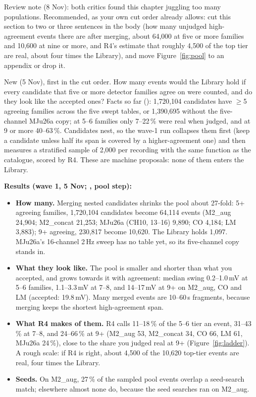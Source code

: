 \begin{instructions}
Review note (8 Nov): both critics found this chapter juggling too many populations. Recommended, as your own cut order
already allows: cut this section to two or three sentences in the body (how many unjudged high-agreement events there
are after merging, about 64,000 at five or more families and 10,600 at nine or more, and R4's estimate that roughly
4,500 of the top tier are real, about four times the Library), and move Figure~\ref{fig:pool} to an appendix or drop
it.

New (5 Nov), first in the cut order. How many events would the Library hold if every candidate that five or more
detector families agree on were counted, and do they look like the accepted ones? Facts so far
(): 1,720,104 candidates have $\ge$5 agreeing families across the five swept
tables, or 1,390,695 without the five-channel MJu26a copy; at 5--6 families only 7--22\,\% were real when judged, and
at 9 or more 40--63\,\%. Candidates nest, so the wave-1 run collapses them first (keep a candidate unless half its span
is covered by a higher-agreement one) and then measures a stratified sample of 2,000 per recording with the same
function as the catalogue, scored by R4. These are machine proposals: none of them enters the Library.

\textbf{Results (wave 1, 5 Nov; , pool step):}
\begin{itemize}
  \item \textbf{How many.} Merging nested candidates shrinks the pool about 27-fold: 5+ agreeing families, 1,720,104
        candidates become 64,114 events (M2\_aug 24,904; M2\_concat 21,253; MJu26a (CH10, 13--16) 9,890; CO 4,184;
        LM 3,883); 9+ agreeing, 230,817 become 10,620. The Library holds 1,097. MJu26a's 16-channel 2\,Hz sweep has no
        table yet, so its five-channel copy stands in.
  \item \textbf{What they look like.} The pool is smaller and shorter than what you accepted, and grows towards it with
        agreement: median swing 0.2--1.0\,mV at 5--6 families, 1.1--3.3\,mV at 7--8, and 14--17\,mV at 9+ on M2\_aug,
        CO and LM (accepted: 19.8\,mV). Many merged events are 10--60\,s fragments, because merging keeps the shortest
        high-agreement span.
  \item \textbf{What R4 makes of them.} R4 calls 11--18\,\% of the 5--6 tier an event, 31--43\,\% at 7--8, and 24--66\,\%
        at 9+ (M2\_aug 53, M2\_concat 34, CO 66, LM 61, MJu26a 24\,\%), close to the share you judged real at 9+
        (Figure~\ref{fig:ladder}). A rough scale: if R4 is right, about 4,500 of the 10,620 top-tier events are real,
        four times the Library.
  \item \textbf{Seeds.} On M2\_aug, 27\,\% of the sampled pool events overlap a seed-search match; elsewhere almost none
        do, because the seed searches ran on M2\_aug.
\end{itemize}
\end{instructions}

